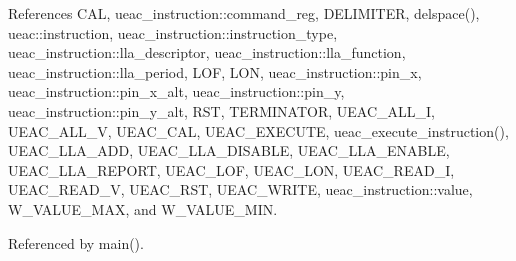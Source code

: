 References CAL, ueac\_\-instruction::command\_\-reg, DELIMITER, delspace(), ueac::instruction, ueac\_\-instruction::instruction\_\-type, ueac\_\-instruction::lla\_\-descriptor, ueac\_\-instruction::lla\_\-function, ueac\_\-instruction::lla\_\-period, LOF, LON, ueac\_\-instruction::pin\_\-x, ueac\_\-instruction::pin\_\-x\_\-alt, ueac\_\-instruction::pin\_\-y, ueac\_\-instruction::pin\_\-y\_\-alt, RST, TERMINATOR, UEAC\_\-ALL\_\-I, UEAC\_\-ALL\_\-V, UEAC\_\-CAL, UEAC\_\-EXECUTE, ueac\_\-execute\_\-instruction(), UEAC\_\-LLA\_\-ADD, UEAC\_\-LLA\_\-DISABLE, UEAC\_\-LLA\_\-ENABLE, UEAC\_\-LLA\_\-REPORT, UEAC\_\-LOF, UEAC\_\-LON, UEAC\_\-READ\_\-I, UEAC\_\-READ\_\-V, UEAC\_\-RST, UEAC\_\-WRITE, ueac\_\-instruction::value, W\_\-VALUE\_\-MAX, and W\_\-VALUE\_\-MIN.

Referenced by main().

